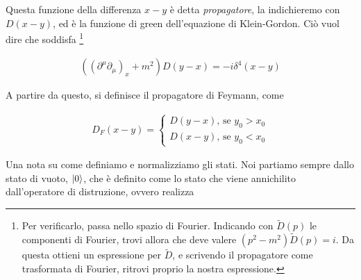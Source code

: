 \documentclass[11pt]{report}
\begin{document}
\begin{center}
\end{center}




Questa funzione della differenza \(x-y\) è detta \emph{propagatore}, la indichieremo con \(D(x-y)\), ed è la funzione di green dell'equazione di Klein-Gordon. Ciò vuol dire che soddisfa \footnote{Per verificarlo, passa nello spazio di Fourier. Indicando con \(\tilde{D}(p)\) le componenti di Fourier, trovi allora che deve valere \((p^2 - m^2)\tilde{D}(p) = i\). Da questa ottieni un espressione per \(\tilde{D}\), e scrivendo il propagatore come trasformata di Fourier, ritrovi proprio la nostra espressione. }

\begin{align}
    ((\partial^\mu\partial_\mu)_x + m^2)D(y-x) = -i\delta^4 (x-y)
\end{align}

A partire da questo, si definisce il propagatore di Feymann, come 

\begin{align}
    D_F(x-y) = \begin{cases}
        D(y-x), \, \text{se } y_0 > x_0 \\ 
        D(x-y), \, \text{se } y_0 < x_0  
    \end{cases}
\end{align}

Una nota su come definiamo e normalizziamo gli stati. Noi partiamo sempre dallo stato di vuoto, \(\ket{0}\), che è definito come lo stato che viene annichilito dall'operatore di distruzione, ovvero realizza 
\end{document}
